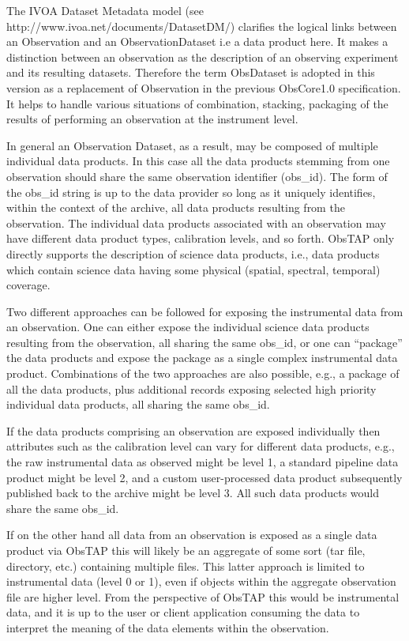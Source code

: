 \documentclass[11pt,a4paper]{ivoa}
\begin{document}
The IVOA Dataset Metadata model (see http://www.ivoa.net/documents/DatasetDM/) clarifies the logical links between an
Observation and an ObservationDataset i.e a data product here. It makes a distinction between an
{\textquotedbl}observation{\textquotedbl} as the description of an observing experiment and its resulting datasets.
Therefore the term ObsDataset is adopted in this version as a replacement of Observation in the previous ObsCore1.0
specification. It helps to handle various situations of combination, stacking, packaging of the results of performing
an observation at the instrument level. 

In general an Observation Dataset, as a result, may be composed of multiple individual data products.  In this case all
the data products stemming from one observation should share the same observation identifier (obs\_id).  The form of
the obs\_id string is up to the data provider so long as it uniquely identifies, within the context of the archive, all
data products resulting from the observation.  The individual data products associated with an observation may have
different data product types, calibration levels, and so forth.  ObsTAP only directly supports the description of
science data products, i.e., data products which contain science data having some physical (spatial, spectral,
temporal) coverage.

Two different approaches can be followed for exposing the instrumental data from an observation. One can either expose
the individual science data products resulting from the observation, all sharing the same obs\_id, or one can
``package'' the data products and expose the package as a single complex instrumental data product. Combinations of the
two approaches are also possible, e.g., a package of all the data products, plus additional records exposing selected
high priority individual data products, all sharing the same obs\_id.

If the data products comprising an observation are exposed individually then attributes such as the calibration level
can vary for different data products, e.g., the raw instrumental data as observed might be level 1, a standard pipeline
data product might be level 2, and a custom user-processed data product subsequently published back to the archive
might be level 3.  All such data products would share the same obs\_id.

If on the other hand all data from an observation is exposed as a single data product via ObsTAP this will likely be an
aggregate of some sort (tar file, directory, etc.) containing multiple files.  This latter approach is limited to
instrumental data (level 0 or 1), even if objects within the aggregate observation file are higher level.  From the
perspective of ObsTAP this would be instrumental data, and it is up to the user or client application consuming the
data to interpret the meaning of the data elements within the observation.
\end{document}
